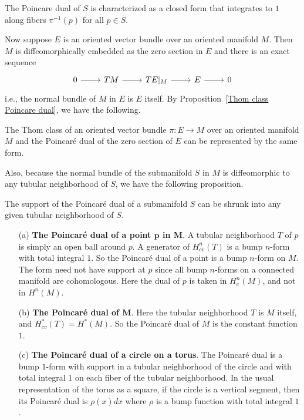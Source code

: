 \begin{corollary}
The Poincare dual of $S$ is characterized as a closed form that integrates to $1$ along fibers $\pi^{-1}(p)$ for all $p\in S$.
\end{corollary}
Now suppose $E$ is an oriented vector bundle over an oriented manifold $M$. Then $M$ is diffeomorphically embedded as the zero section in $E$ and there is an exact sequence
\[\begin{tikzcd}
0\ar[r]&TM\ar[r]&TE|_M\ar[r]&E\ar[r]&0
\end{tikzcd}\]
i.e., the normal bundle of $M$ in $E$ is $E$ itself. By Proposition~\ref{Thom class Poincare dual}, we have the following.
\begin{corollary}
The Thom class of an oriented vector bundle $\pi:E\to M$ over an oriented manifold $M$ and the Poincar\'e dual of the zero section of $E$ can be represented by the same 
form.
\end{corollary}
Also, because the normal bundle of the submanifold $S$ in $M$ is diffeomorphic to any tubular neighborhood of $S$, we have the following proposition.
\begin{proposition}
The support of the Poincar\'e dual of a submanifold $S$ can be shrunk into any given tubular neighborhood of $S$.
\end{proposition}
\begin{example}
\mbox{}
\begin{itemize}
\item[(a)] \textbf{The Poincar\'e dual of a point $\bm{p}$ in $\bm{M}$}. A tubular neighborhood $T$ of $p$ is simply an open ball around $p$. A generator of $H^n_{cv}(T)$ 
is a bump $n$-form with total integral $1$. So the Poincar\'e dual of a point is a bump $n$-form on $M$. The form need not have support at $p$ since all bump $n$-forms on 
a connected manifold are cohomologous. Here the dual of $p$ is taken in $H^n_{c}(M)$, and not in $H^n(M)$.
\item[(b)] \textbf{The Poincar\'e dual of $\bm{M}$}. Here the tubular neighborhood $T$ is $M$ itself, and $H^*_{cv}(T)=H^*(M)$. So the Poincar\'e dual of $M$ is the 
constant function $1$.
\item[(c)] \textbf{The Poincar\'e dual of a circle on a torus}. The Poincar\'e dual is a bump $1$-form with support in a tubular neighborhood of the circle and with 
total integral $1$ on each fiber of the tubular neighborhood. In the usual representation of the torus as a square, if the circle is a vertical segment, then its 
Poincar\'e dual is $\rho(x)dx$ where $\rho$ is a bump function with total integral $1$.
\end{itemize}
\end{example}
